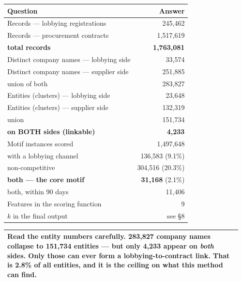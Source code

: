 \documentclass[11pt,a4paper]{article}
\makeatletter
\newenvironment{keybox}{\par\vspace{0.3em}\noindent
  \begin{tabular}{|@{\hspace{9pt}}p{0.955\linewidth}@{\hspace{9pt}}|}\hline
  \rule{0pt}{1.1em}}{\\[0.5em]\hline\end{tabular}\par\vspace{0.3em}}
\makeatother
\begin{document}
\begin{center}\small
\begin{tabular}{@{}lr@{}}
\toprule
\textbf{Question} & \textbf{Answer} \\
\midrule
Records --- lobbying registrations       & 245{,}462 \\
Records --- procurement contracts        & 1{,}517{,}619 \\
\quad \textbf{total records}             & \textbf{1{,}763{,}081} \\
\addlinespace
Distinct company names --- lobbying side & 33{,}574 \\
Distinct company names --- supplier side & 251{,}885 \\
\quad union of both                      & 283{,}827 \\
\addlinespace
Entities (clusters) --- lobbying side    & 23{,}648 \\
Entities (clusters) --- supplier side    & 132{,}319 \\
\quad union                              & 151{,}734 \\
\quad \textbf{on BOTH sides (linkable)}  & \textbf{4{,}233} \\
\addlinespace
Motif instances scored                   & 1{,}497{,}648 \\
\quad with a lobbying channel            & 136{,}583 \quad (9.1\%) \\
\quad non-competitive                    & 304{,}516 \quad (20.3\%) \\
\quad \textbf{both --- the core motif}   & \textbf{31{,}168} \quad (2.1\%) \\
\quad both, within 90 days               & 11{,}406 \\
\addlinespace
Features in the scoring function         & 9 \\
$k$ in the final output                  & see \S8 \\
\bottomrule
\end{tabular}
\end{center}

\begin{keybox}
\textbf{Read the entity numbers carefully.} 283{,}827 company names collapse to 151{,}734
entities --- but only \textbf{4{,}233} appear on \emph{both} sides. Only those can ever
form a lobbying-to-contract link. That is 2.8\% of all entities, and it is the ceiling on
what this method can find.
\end{keybox}

\end{document}
